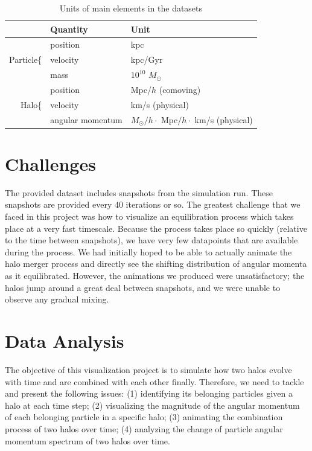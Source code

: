 \documentclass[12pt]{article}
\newcommand{\Msun}{\ensuremath{M_\odot}}
\begin{document}
\begin{table}[h]
\centering
\begin{tabular}{rll}
                          &  \textbf{Quantity} & \textbf{Unit} \\
\hline
\multirow{3}{*}{Particle\Huge\{} &  position          & kpc             \\
                                 &  velocity          & kpc/Gyr         \\
                                 &  mass              & $10^{10}$ \Msun \\
\hline
\multirow{3}{*}{Halo\Huge\{}     &  position          & Mpc/$h$ (comoving) \\
                                 &  velocity          & km/s (physical)  \\
                                 &  angular momentum  & $\Msun/h \cdot$ Mpc$/h \cdot$ km/s (physical)  \\
\end{tabular}
\caption {Units of main elements in the datasets}
\label{tab:units}
\end{table}

\section{Challenges}
\label{sec:challenges}
The provided dataset includes snapshots from the simulation run. These
snapshots are provided every 40 iterations or so. The greatest challenge that
we faced in this project was how to visualize an equilibration process which
takes place at a very fast timescale. Because the process takes place so
quickly (relative to the time between snapshots), we have very few datapoints
that are available during the process. We had initially hoped to be able to
actually animate the halo merger process and directly see the shifting
distribution of angular momenta as it equilibrated. However, the animations we
produced were unsatisfactory; the halos jump around a great deal between
snapshots, and we were unable to observe any gradual mixing.

\section{Data Analysis}
The objective of this visualization project is to simulate how two halos evolve with 
time and are combined with each other finally. Therefore, we need to tackle and present
the following issues: (1) identifying its belonging particles given a halo at each time 
step; (2) visualizing the magnitude of the angular momentum of each belonging particle 
in a specific halo; (3) animating the combination process of two halos over time;
(4) analyzing the change of particle angular momentum spectrum of two halos over time.
\end{document}
